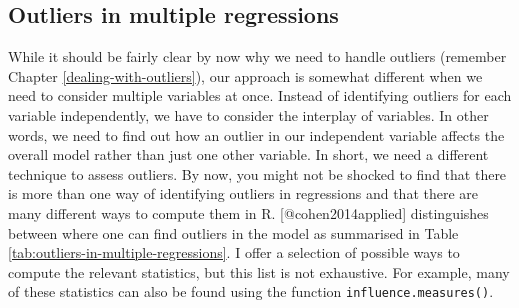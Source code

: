 \documentclass[
]{book}
\begin{document}
\hypertarget{outliers-in-multiple-regressions}{%
\subsection{Outliers in multiple regressions}\label{outliers-in-multiple-regressions}}

While it should be fairly clear by now why we need to handle outliers (remember Chapter \ref{dealing-with-outliers}), our approach is somewhat different when we need to consider multiple variables at once. Instead of identifying outliers for each variable independently, we have to consider the interplay of variables. In other words, we need to find out how an outlier in our independent variable affects the overall model rather than just one other variable. In short, we need a different technique to assess outliers. By now, you might not be shocked to find that there is more than one way of identifying outliers in regressions and that there are many different ways to compute them in R. {[}@cohen2014applied{]} distinguishes between where one can find outliers in the model as summarised in Table \ref{tab:outliers-in-multiple-regressions}. I offer a selection of possible ways to compute the relevant statistics, but this list is not exhaustive. For example, many of these statistics can also be found using the function \texttt{influence.measures()}.
\end{document}
